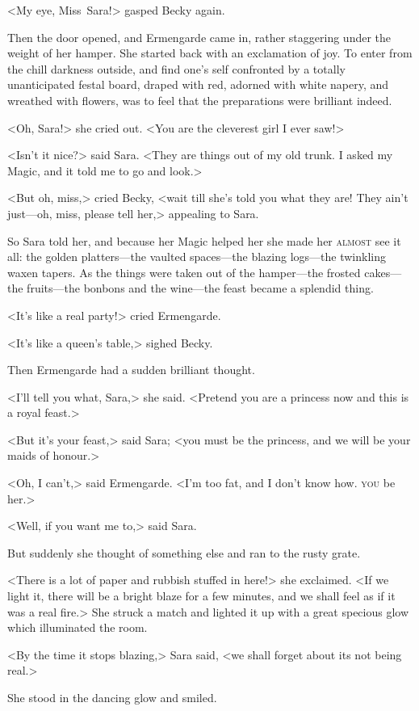 <My eye, Miss~Sara!> gasped Becky again.

Then the door opened, and Ermengarde came in, rather staggering under the weight of her hamper. She started back with an exclamation of joy. To enter from the chill darkness outside, and find one's self confronted by a totally unanticipated festal board, draped with red, adorned with white napery, and wreathed with flowers, was to feel that the preparations were brilliant indeed.

<Oh, Sara!> she cried out. <You are the cleverest girl I ever saw!>

<Isn't it nice?> said Sara. <They are things out of my old trunk. I asked my Magic, and it told me to go and look.>

<But oh, miss,> cried Becky, <wait till she's told you what they are! They ain't just—oh, miss, please tell her,> appealing to Sara.

So Sara told her, and because her Magic helped her she made her \textsc{almost} see it all: the golden platters—the vaulted spaces—the blazing logs—the twinkling waxen tapers. As the things were taken out of the hamper—the frosted cakes—the fruits—the bonbons and the wine—the feast became a splendid thing.

<It's like a real party!> cried Ermengarde.

<It's like a queen's table,> sighed Becky.

Then Ermengarde had a sudden brilliant thought.

<I'll tell you what, Sara,> she said. <Pretend you are a princess now and this is a royal feast.>

<But it's your feast,> said Sara; <you must be the princess, and we will be your maids of honour.>

<Oh, I can't,> said Ermengarde. <I'm too fat, and I don't know how. \textsc{you} be her.>

<Well, if you want me to,> said Sara.

But suddenly she thought of something else and ran to the rusty grate.

<There is a lot of paper and rubbish stuffed in here!> she exclaimed. <If we light it, there will be a bright blaze for a few minutes, and we shall feel as if it was a real fire.> She struck a match and lighted it up with a great specious glow which illuminated the room.

<By the time it stops blazing,> Sara said, <we shall forget about its not being real.>

She stood in the dancing glow and smiled.

